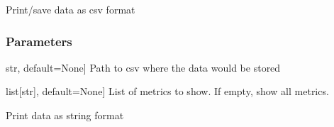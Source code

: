 \documentclass[letterpaper,10pt,english]{sphinxmanual}
\begin{document}
\begin{fulllineitems}
\begin{fulllineitems}
\begin{description}
\end{description}

\end{fulllineitems}


\begin{fulllineitems}
\label{\detokenize{report/_autosummary/miml.report.report.Report:miml.report.report.Report.to_csv}}
\pysigstartsignatures
{}
\pysigstopsignatures
\sphinxAtStartPar
Print/save data as csv format


\subsubsection{Parameters}
\label{\detokenize{report/_autosummary/miml.report.report.Report:id1}}\begin{description}
\sphinxlineitem{path}{[}str, default=None{]}
\sphinxAtStartPar
Path to csv where the data would be stored

\sphinxlineitem{metrics}{[}list{[}str{]}, default=None{]}
\sphinxAtStartPar
List of metrics to show. If empty, show all metrics.

\end{description}

\end{fulllineitems}


\begin{fulllineitems}
\label{\detokenize{report/_autosummary/miml.report.report.Report:miml.report.report.Report.to_string}}
\pysigstartsignatures
{}
\pysigstopsignatures
\sphinxAtStartPar
Print data as string format



\end{fulllineitems}
\end{fulllineitems}
\end{document}
